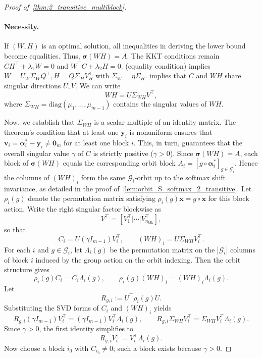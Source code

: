\documentclass[11pt]{article}
\begin{document}
\begin{proof}[Proof of~\cref{thm:2_transitive_multiblock}]
\paragraph{Necessity.}
If \((W,H)\) is an optimal solution, all inequalities in deriving the lower bound become equalities. Thus, \(\boldsymbol{\sigma}(WH)=A\). The KKT conditions remain \(C H^\top + \lambda_1 W = 0\) and \(W^\top C + \lambda_2 H = 0\).
 (equality condition) implies \(W=U_W\Sigma_W Q^\top, H=Q\Sigma_H V_H^\top\) with \(\Sigma_W=\eta \Sigma_H\).
 implies that \(C\) and \(WH\) share singular directions \(U,V\). We can write
\[ WH = U\Sigma_{WH}V^\top, \]
where \(\Sigma_{WH} = \mathrm{diag}(\mu_1, \dots, \mu_{m-1})\) contains the singular values of \(WH\).

Now, we establish that \(\Sigma_{WH}\) is a scalar multiple of an identity matrix. The theorem's condition that at least one \(\boldsymbol{y}_i\) is nonuniform ensures that \(\boldsymbol{v}_i = \boldsymbol{\alpha}_i^* - \boldsymbol{y}_i \neq \boldsymbol{0}_m\) for at least one block \(i\). This, in turn, guarantees that the overall singular value \(\gamma\) of \(C\) is strictly positive (\(\gamma > 0\)). 
Since \(\boldsymbol{\sigma}(WH)=A\), each block of \(\boldsymbol{\sigma}(WH)\) equals the corresponding orbit block \(A_i=[g\circ\boldsymbol{\alpha}_i^*]_{g\in\mathcal G_i}\). Hence the columns of \((WH)_i\) form the same \(\mathcal G_i\)-orbit up to the softmax shift invariance, as detailed in the proof of~\cref{lem:orbit_S_softmax_2_transitive}. Let \(\rho_i(g)\) denote the permutation matrix satisfying \(\rho_i(g)\boldsymbol{x}=g\circ\boldsymbol{x}\) for this block action.
Write the right singular factor blockwise as
\[
V^\top=[V_1^\top|\cdots|V_{n_{\mathrm{blk}}}^\top],
\]
so that
\[
C_i = U(\gamma I_{m-1})V_i^\top,
\qquad
(WH)_i = U\Sigma_{WH}V_i^\top.
\]
For each \(i\) and \(g\in \mathcal G_i\), let \(\Lambda_i(g)\) be the permutation matrix on the \(|\mathcal G_i|\) columns of block \(i\) induced by the group action on the orbit indexing. Then the orbit structure gives
\[
\rho_i(g)C_i = C_i\Lambda_i(g),
\qquad
\rho_i(g)(WH)_i = (WH)_i\Lambda_i(g).
\]
Let
\[
R_{g,i}:=U^\top \rho_i(g)U.
\]
Substituting the SVD forms of \(C_i\) and \((WH)_i\) yields
\[
R_{g,i}(\gamma I_{m-1})V_i^\top = (\gamma I_{m-1})V_i^\top \Lambda_i(g),
\qquad
R_{g,i}\Sigma_{WH}V_i^\top = \Sigma_{WH}V_i^\top \Lambda_i(g).
\]
Since \(\gamma>0\), the first identity simplifies to
\[
R_{g,i}V_i^\top = V_i^\top \Lambda_i(g).
\]
Now choose a block \(i_0\) with \(C_{i_0}\neq 0\); such a block exists because \(\gamma>0\).

\end{proof}
\end{document}
